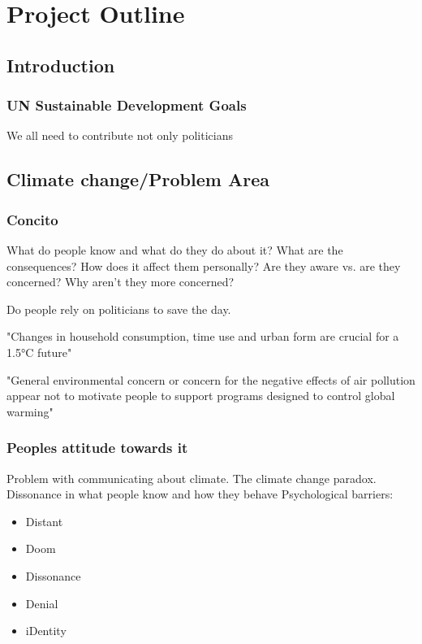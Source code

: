 \chapter{Project Outline}
\section{Introduction}
    \subsection{UN Sustainable Development Goals}
    We all need to contribute not only politicians
    
\section{Climate change/Problem Area}\label{sec:problemArea}
    \subsection{Concito}
    What do people know and what do they do about it? 
    What are the consequences? 
    How does it affect them personally? 
    Are they aware vs. are they concerned?
    Why aren't they more concerned?\cite{concito}
    
    Do people rely on politicians to save the day.
    
    "Changes in household consumption, time use and urban form are crucial for a 1.5°C future"\cite{householdTimeUseCarbonFootprints}
    
    "General environmental concern or concern for the negative effects of air pollution appear not to motivate people to support programs designed to control global warming"\cite{climateConcernAndMotivationToChange}

    \subsection{Peoples attitude towards it}
    Problem with communicating about climate\cite{vrEngagementClimateChange}\cite{storyAboutClimateChange}.
    The climate change paradox\cite{the5Ds}.
    Dissonance in what people know and how they behave\cite{the5Ds}
    Psychological barriers:
    \begin{itemize}
        \item Distant
        \item Doom
        \item Dissonance
        \item Denial
        \item iDentity
    \end{itemize}
    
